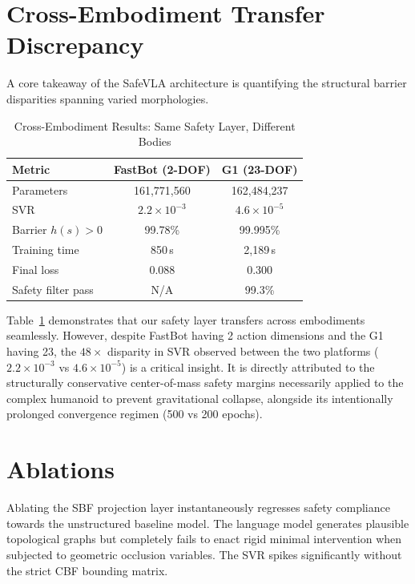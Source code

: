 \documentclass[conference]{IEEEtran}
\begin{document}
\section{Cross-Embodiment Transfer Discrepancy}

A core takeaway of the SafeVLA architecture is quantifying the structural barrier disparities spanning varied morphologies. 

\begin{table}[h]
\centering
\caption{Cross-Embodiment Results: Same Safety Layer, Different Bodies}
\label{tab:cross}
\begin{tabular}{@{}lcc@{}}
\toprule
\textbf{Metric} & \textbf{FastBot (2-DOF)} & \textbf{G1 (23-DOF)} \\
\midrule
Parameters          & 161,771,560 & 162,484,237 \\
SVR                 & $2.2 \times 10^{-3}$ & $4.6 \times 10^{-5}$ \\
Barrier $h(s) > 0$  & 99.78\% & 99.995\% \\
Training time       & 850\,s & 2{,}189\,s \\
Final loss          & 0.088 & 0.300 \\
Safety filter pass  & N/A & 99.3\% \\
\bottomrule
\end{tabular}
\end{table}

Table~\ref{tab:cross} demonstrates that our safety layer transfers across embodiments seamlessly. However, despite FastBot having 2 action dimensions and the G1 having 23, the $48\times$ disparity in SVR observed between the two platforms ($2.2 \times 10^{-3}$ vs $4.6 \times 10^{-5}$) is a critical insight. It is directly attributed to the structurally conservative center-of-mass safety margins necessarily applied to the complex humanoid to prevent gravitational collapse, alongside its intentionally prolonged convergence regimen (500 vs 200 epochs).

\section{Ablations}
Ablating the SBF projection layer instantaneously regresses safety compliance towards the unstructured baseline model. The language model generates plausible topological graphs but completely fails to enact rigid minimal intervention when subjected to geometric occlusion variables. The SVR spikes significantly without the strict CBF bounding matrix.
\end{document}

